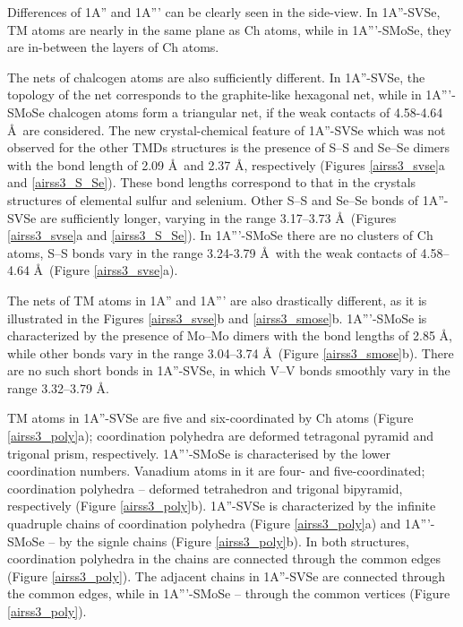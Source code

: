 \documentclass[a4paperm]{article}
\begin{document}
Differences of 1A'' and 1A''' can be clearly seen in the side-view.
In 1A''-SVSe, TM atoms are nearly in the same plane as Ch atoms, while in 1A'''-SMoSe,  they are in-between the layers of Ch atoms.

The nets of chalcogen atoms are also sufficiently different.
In 1A''-SVSe, the topology of the net corresponds to the graphite-like hexagonal net, while in 1A'''-SMoSe chalcogen atoms form a triangular net, if the weak contacts of 4.58-4.64 \AA\ are considered.
The new crystal-chemical feature of 1A''-SVSe which was not observed for the other TMDs structures is the presence of S--S and Se--Se dimers with the bond length of 2.09 \AA\ and 2.37 \AA, respectively (Figures \ref{airss3_svse}a and \ref{airss3_S_Se}).
These bond lengths correspond to that in the crystals structures of elemental sulfur and selenium.
Other S--S and Se--Se bonds of 1A''-SVSe are  sufficiently longer, varying in the range 3.17--3.73 \AA\ (Figures \ref{airss3_svse}a and \ref{airss3_S_Se}).
In 1A'''-SMoSe there are no clusters of Ch atoms, S--S bonds vary in the range 3.24-3.79 \AA\ with the weak contacts of 4.58--4.64 \AA\ (Figure \ref{airss3_svse}a).

The nets of TM atoms in 1A'' and 1A''' are also drastically different, as it is illustrated in the Figures \ref{airss3_svse}b and \ref{airss3_smose}b.
1A'''-SMoSe is characterized by the presence of Mo--Mo dimers with the bond lengths of 2.85 \AA, while other bonds vary in the range 3.04--3.74 \AA\ (Figure \ref{airss3_smose}b).
There are no such short bonds in 1A''-SVSe, in which V--V bonds smoothly vary in the range 3.32--3.79 \AA.

TM atoms in 1A''-SVSe are five and six-coordinated by Ch atoms (Figure \ref{airss3_poly}a);
coordination polyhedra are  deformed tetragonal pyramid and trigonal prism, respectively.
1A'''-SMoSe is characterised by the lower coordination numbers.
Vanadium atoms in it are four- and five-coordinated; coordination polyhedra -- deformed tetrahedron and trigonal bipyramid, respectively (Figure \ref{airss3_poly}b).
1A''-SVSe is characterized by the infinite quadruple chains of coordination polyhedra (Figure \ref{airss3_poly}a) and 1A'''-SMoSe -- by the signle chains (Figure \ref{airss3_poly}b).
In both structures, coordination polyhedra in the chains are connected through the common edges (Figure \ref{airss3_poly}).
The adjacent chains in 1A''-SVSe are connected through the common edges, while in 1A'''-SMoSe -- through the common vertices (Figure \ref{airss3_poly}).
\end{document}
